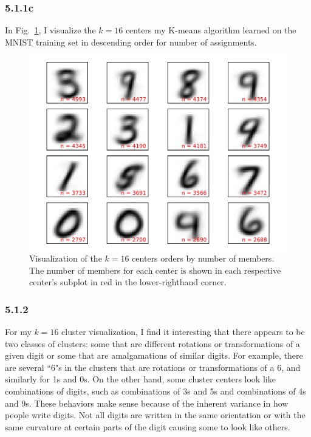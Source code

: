 \documentclass[12pt]{amsart}
\begin{document}
\subsubsection*{5.1.1c}
In Fig.~\ref{fig:k_16_means}, I visualize the $k = 16$ centers my K-means algorithm learned on the MNIST training set in descending order for number of assignments.
\begin{figure}[H]
	\includegraphics[width=\columnwidth]{k_16_means.pdf}
    \caption{Visualization of the $k = 16$ centers orders by number of members.  The number of members for each center is shown in each respective center's subplot in red in the lower-righthand corner.}
    \label{fig:k_16_means}
\end{figure}

\subsubsection*{5.1.2}
For my $k = 16$ cluster visualization, I find it interesting that there appears to be two classes of clusters: some that are different rotations or transformations of a given digit or some that are amalgamations of similar digits.  For example, there are several ``6"s in the clusters that are rotations or transformations of a 6, and similarly for 1s and 0s.  On the other hand, some cluster centers look like combinations of digits, such as combinations of 3s and 5s and combinations of 4s and 9s.  These behaviors make sense because of the inherent variance in how people write digits.  Not all digits are written in the same orientation or with the same curvature at certain parts of the digit causing some to look like others.
\end{document}
